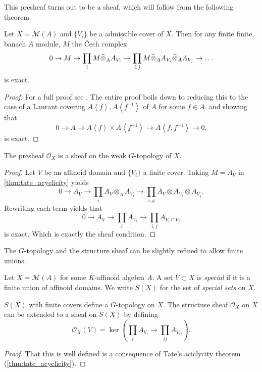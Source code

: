 This presheaf turns out to be a sheaf, which will follow from the following theorem. 
\begin{theorem}\label{thm:tate_acyclicity}
	Let $X = \mathcal{M} (A)$ and $\{V_i\} $ be a admissible cover of $X$. 
	Then for any finite finite banach $A$ module, $M$ the Čech complex \[
		0 \to M \to \prod_{i} M \widehat{\otimes}_A A_{V_i} \to \prod_{i, j} M \widehat{\otimes}_A A_{V_i} \widehat{\otimes}_A A_{V_j} \to \ldots
	\] 
	is exact. 
\end{theorem}
\begin{proof}
	For a full proof see \cite[][prop.\ 2.2.5]{berkovichSpectralTheoryAnalytic2012}. 
	The entire proof boils down to reducing this to the case of a Laurant covering $A\left<f \right>, A\left<f^{-1} \right>$ of $A$ for some $f \in A$. and showing that \[
		0 \to A \to A\left<f \right>\times  A\left<f^{-1} \right> \to A\left<f, f^{-1} \right> \to 0
	.\]  
	is exact. 
\end{proof}


\begin{corollary}
	The presheaf $\mathcal{O}_X$ is a sheaf on the weak $G$-topology of $X$.
\end{corollary}
\begin{proof}
	Let $V$ be an affinoid domain and $\{V_i\} $ a finite cover. 
	Taking $M = A_V$ in \cref{thm:tate_acyclicity} yields \[
	0 \to A_V \to \prod_{i } A_V \otimes_A A_{V_i} \to \prod_{i,g} A_V \otimes A_{V_i} \otimes A_{V_j}
	.\] 
	Rewriting each term yields that \[
	0 \to A_V \to \prod_i A_{V_i} \to \prod_{i, j} A_{V_i \cap V_j}
	\] 
	is exact. Which is exactly the sheaf condition. 
\end{proof}

The $G$-topology and the structure sheaf can be slightly refined to allow finite unions. 
\begin{definition}
	Let $X = \mathcal{M} (A)$ for some $K$-affinoid algebra $A$. 
	A set $V\subset  X$ is \emph{special} if it is a finite union of affinoid domains. 
	We write $S(X)$ for the set of \emph{special sets} on $X$. 
\end{definition}

\begin{proposition}
	$S(X)$ with finite covers define a $G$-topology on $X$. 
	The structuse sheaf  $\mathcal{O}_X$ on $X$ can be extended to a sheaf on $S(X)$ by defining \[
		\mathcal{O}_X(V) = \ker\left(\prod_i A_{V_i} \to \prod_{ij} A_{V_{ij}}\right)
	.\] 
\end{proposition}
\begin{proof}
	That this is well defined is a consequence of Tate's aciclycity theorem (\ref{thm:tate_acyclicity}). 
\end{proof}


